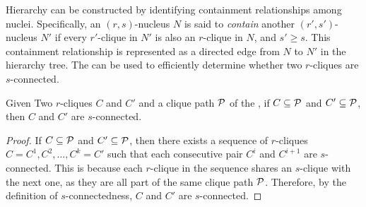 
Hierarchy can be constructed by identifying containment relationships among nuclei. Specifically, an $(r,s)$-nucleus $N$ is said to \emph{contain} another $(r',s')$-nucleus $N'$ if every $r'$-clique in $N'$ is also an $r$-clique in $N$, and $s' \ge s$. 
This containment relationship is represented as a directed edge from $N$ to $N'$ in the hierarchy tree. 
The \cpi can be used to efficiently determine whether two $r$-cliques are $s$-connected.


\begin{theorem} 
\label{thm:clique_connectivity}
Given Two $r$-cliques $C$ and $C'$ and a clique path $\TPath$ of the \cpi, if $C\subseteq \TPath$ and $C'\subseteq \TPath$, then $C$ and $C'$ are $s$-connected.
\end{theorem}

\begin{proof}
If $C\subseteq \TPath$ and $C'\subseteq \TPath$, then there exists a sequence of $r$-cliques $C=C^1, C^2, \ldots, C^k=C'$ such that each consecutive pair $C^i$ and $C^{i+1}$ are $s$-connected. This is because each $r$-clique in the sequence shares an $s$-clique with the next one, as they are all part of the same clique path $\TPath$. Therefore, by the definition of $s$-connectedness, $C$ and $C'$ are $s$-connected.
\end{proof} 

